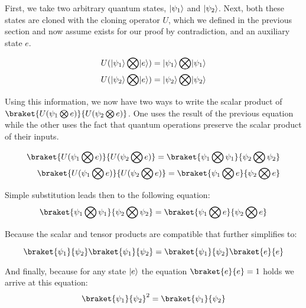First, we take two arbitrary quantum states, $\lvert\psi_1\rangle$ and $\lvert\psi_2\rangle$.
Next, both these states are cloned with the cloning operator $U$, which we defined in the previous section and now assume
exists for our proof by contradiction, and an auxiliary state $e$.

\begin{equation}
\begin{split}
    U(\lvert\psi_1\rangle \bigotimes \lvert e\rangle) = \lvert\psi_1\rangle \bigotimes \lvert\psi_1\rangle\\
    U(\lvert\psi_2\rangle \bigotimes \lvert e\rangle) = \lvert\psi_2\rangle \bigotimes \lvert\psi_2\rangle
\end{split}\label{eq:clone_two_states}
\end{equation}

Using this information, we now have two ways to write the scalar product of
$\braket{U(\psi_1 \bigotimes e)}{U(\psi_2 \bigotimes e)}$.
One uses the result of the previous equation
while the other uses the fact that quantum operations preserve the scalar product of their inputs\cite{findsource}.

\begin{equation}
\begin{split}
    \braket{U(\psi_1 \bigotimes e)}{U(\psi_2 \bigotimes e)} = \braket{\psi_1 \bigotimes \psi_1}{\psi_2 \bigotimes \psi_2}\\
    \braket{U(\psi_1 \bigotimes e)}{U(\psi_2 \bigotimes e)} = \braket{\psi_1 \bigotimes e}{\psi_2 \bigotimes e}
\end{split}\label{eq:two_scalar_products}
\end{equation}

Simple substitution leads then to the following equation:
\begin{equation}
    \braket{\psi_1 \bigotimes \psi_1}{\psi_2 \bigotimes \psi_2} =
    \braket{\psi_1 \bigotimes e}{\psi_2 \bigotimes e}
\label{eq:tensor_equals}
\end{equation}

Because the scalar and tensor products are compatible that further simplifies to:

\begin{equation}
    \braket{\psi_1}{\psi_2}\braket{\psi_1}{\psi_2}=\braket{\psi_1}{\psi_2}\braket{e}{e}
    \label{eq:scalar_equals}
\end{equation}

And finally, because for any state $\lvert e\rangle$ the equation $\braket{e}{e} = 1$ holds we arrive at this equation:
\begin{equation}
    \braket{\psi_1}{\psi_2}^2 = \braket{\psi_1}{\psi_2}
    \label{eq:square_equals_single}
\end{equation}

